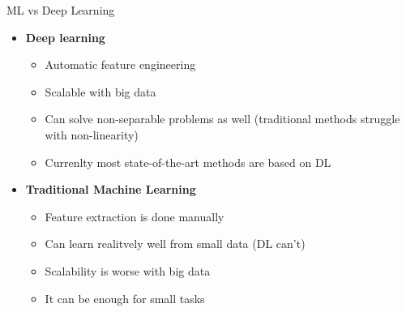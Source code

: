\documentclass[bigger]{beamer}
\begin{document}
\begin{frame}{ML vs Deep Learning}
	\begin{itemize}
		\item \textbf{Deep learning}
		\begin{itemize}
			\item Automatic feature engineering
			\item Scalable with big data
			\item Can solve non-separable problems as well (traditional methods struggle with non-linearity)
			\item Currenlty most state-of-the-art methods are based on DL
		\end{itemize}
		\item \textbf{Traditional Machine Learning}
		\begin{itemize}
			\item Feature extraction is done manually
			\item Can learn realitvely well from small data (DL can't)
			\item Scalability is worse with big data
			\item It can be enough for small tasks
		\end{itemize}
	\end{itemize}
\end{frame}
\end{document}
